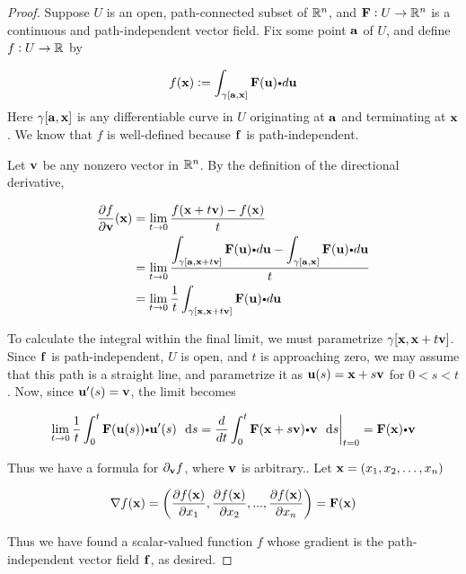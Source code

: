 \begin{proof}
 
 Suppose $U$ is an open, path-connected subset of $\mathbb{R}^n$, and $\mathbf{ F} : U \to \mathbb{R}^n$ is a continuous
 and path-independent vector field. Fix some point   $\mathbf{ a}$ of $U$, and define $f : U \to \mathbb{R}$ by

\[f(\vector{x}) := \dint_{\gamma[\vector{a}, \vector{x}]} \vector{F}(\vector{u}) \bp d\vector{u} \]
Here $\gamma[\mathbf{ a}, \mathbf{ x}]$ is any  differentiable curve in $U$ originating at $\mathbf{ a}$ and terminating at $\mathbf{ x}$. We know that $f$ is well-defined because $\mathbf{ f}$ is path-independent.

Let $\mathbf{ v}$ be any nonzero vector in $\mathbb{R}^n$. By the definition of the directional derivative,

\begin{align} 
\dfrac{\partial f}{\partial \vector{v}}(\vector{x}) &= \lim_{t \to 0} \dfrac{f(\vector{x} + t\vector{v}) - f(\vector{x})}{t} \\
&= \lim_{t \to 0} \dfrac{\dint_{\gamma[\vector{a}, \vector{x} + t\vector{v}]} \vector{F}(\vector{u}) \bp d\vector{u} - \dint_{\gamma[\vector{a}, \vector{x}]} \vector{F}(\vector{u}) \bp d\vector{u}}{t} \\
&= \lim_{t \to 0} \dfrac{1}{t} \dint_{\gamma[\vector{x}, \vector{x} + t\vector{v}]} \vector{F}(\vector{u}) \bp d\vector{u}
\end{align}

To calculate the integral within the final limit, we must parametrize $\gamma[\mathbf{ x}, \mathbf{ x}+t\mathbf{ v}]$. Since $\mathbf{ f}$ is path-independent, $U$ is open, and $t$ is approaching zero, we may assume that this path is a straight line, and parametrize it as 
$\mathbf{ u}(s) = \mathbf{ x} + s\mathbf{ v}$ for $0 < s < t$. Now, since $\mathbf{ u} '(s) = \mathbf{ v}$, the limit becomes

\[ \lim_{t \to 0} \dfrac{1}{t} \dint_0^t \vector{F}(\vector{u}(s)) \bp \vector{u}'(s)\,\ds =  \dfrac{d}{dt} \dint_0^t \vector{F}(\vector{x} + s\vector{v}) \bp \vector{v}\,\ds \bigg|_{t=0} = \vector{F}(\vector{x}) \bp \vector{v} \]

Thus we have a formula for $\partial_{\mathbf{ v}} f$, where $\mathbf{ v}$ is arbitrary.. Let $\mathbf{ x} = (x_1, x_2, \dots, x_n)$ 

\[\nabla f(\mathbf{ x}) = \bigg( \dfrac{\partial f(\mathbf{ x})}{\partial x_1}, \dfrac{\partial f(\mathbf{ x})}{\partial x_2}, . . . , \dfrac{\partial f(\mathbf{ x})}{\partial x_n} \bigg)  = \mathbf{ F}(\mathbf{ x})\]

Thus we have found a scalar-valued function $f$ whose gradient is the path-independent vector field $\mathbf{ f}$, as desired.
 
\end{proof}

